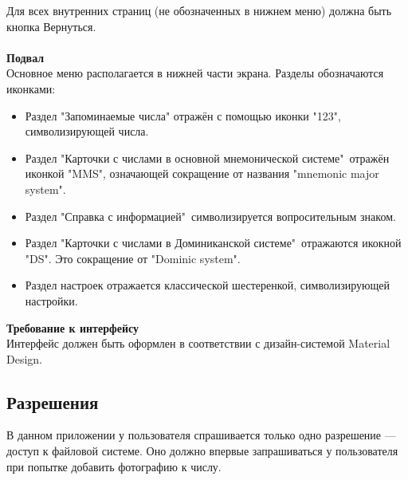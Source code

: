 \documentclass[draft]{article}
\begin{document}
Для всех внутренних страниц (не обозначенных в нижнем меню) должна быть кнопка
Вернуться.\\
~\\
\textbf{Подвал}\\
Основное меню располагается в нижней части экрана. Разделы обозначаются иконками:
\begin{itemize}
\item Раздел "{}Запоминаемые числа"{} отражён с помощью иконки "{}123"{}, символизирующей числа.
\item Раздел "{}Карточки с числами в основной мнемонической системе"{}\ отражён иконкой "{}MMS"{}, означающей сокращение от названия "{}mnemonic major system"{}.
\item Раздел "{}Справка с информацией"{}\ символизируется вопросительным знаком.
\item Раздел "{}Карточки с числами в Доминиканской системе"{}\ отражаются икокной "{}DS"{}. Это сокращение от "{}Dominic system"{}.
\item Раздел настроек отражается классической шестеренкой, символизирующей настройки.
\end{itemize}
\textbf{Требование к интерфейсу}\\
Интерфейс должен быть оформлен в соответствии с дизайн-системой Material Design.
\subsection{Разрешения}
В данном приложении у пользователя спрашивается только одно разрешение — доступ к файловой системе. Оно должно впервые запрашиваться у пользователя при попытке добавить фотографию к числу.
\end{document}
